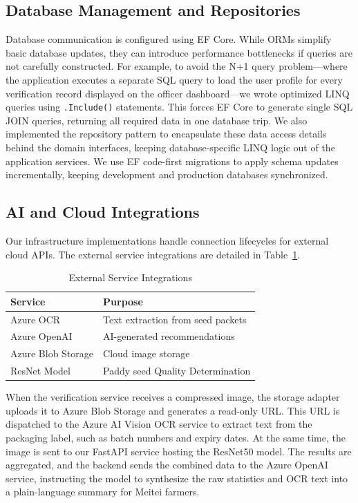 \subsection{Database Management and Repositories}
Database communication is configured using EF Core. While ORMs simplify basic database updates, they can introduce performance bottlenecks if queries are not carefully constructed. For example, to avoid the N+1 query problem—where the application executes a separate SQL query to load the user profile for every verification record displayed on the officer dashboard—we wrote optimized LINQ queries using \texttt{.Include()} statements. This forces EF Core to generate single SQL JOIN queries, returning all required data in one database trip. We also implemented the repository pattern to encapsulate these data access details behind the domain interfaces, keeping database-specific LINQ logic out of the application services. We use EF code-first migrations to apply schema updates incrementally, keeping development and production databases synchronized.

\subsection{AI and Cloud Integrations}
Our infrastructure implementations handle connection lifecycles for external cloud APIs. The external service integrations are detailed in Table~\ref{tab:external-services}.

\begin{table}[htbp]
\centering
\caption{External Service Integrations}
\label{tab:external-services}
\small
\renewcommand{\arraystretch}{1.1}

\begin{tabularx}{\textwidth}{|p{5.2cm}|X|}
\hline
\textbf{Service} & \textbf{Purpose} \\
\hline
Azure OCR & Text extraction from seed packets \\
\hline
Azure OpenAI & AI-generated recommendations \\
\hline
Azure Blob Storage & Cloud image storage \\
\hline
ResNet Model & Paddy seed Quality Determination\\
\hline
\end{tabularx}
\end{table}

When the verification service receives a compressed image, the storage adapter uploads it to Azure Blob Storage and generates a read-only URL. This URL is dispatched to the Azure AI Vision OCR service to extract text from the packaging label, such as batch numbers and expiry dates. At the same time, the image is sent to our FastAPI service hosting the ResNet50 model. The results are aggregated, and the backend sends the combined data to the Azure OpenAI service, instructing the model to synthesize the raw statistics and OCR text into a plain-language summary for Meitei farmers.


